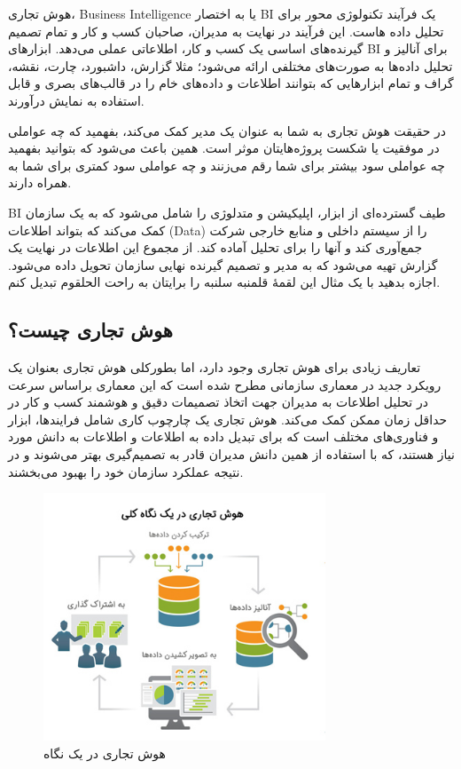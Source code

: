 \documentclass{llncs}
\begin{document}
هوش تجاری، Business Intelligence یا به اختصار BI یک فرآیند تکنولوژی محور برای تحلیل داده هاست. این فرآیند در نهایت به مدیران، صاحبان کسب و کار و تمام تصمیم گیرنده‌های اساسی یک کسب و کار، اطلاعاتی عملی می‌دهد. ابزارهای BI برای آنالیز و تحلیل داده‌ها به صورت‌های مختلفی ارائه می‌شود؛ مثلا گزارش، داشبورد، چارت، نقشه، گراف و تمام ابزارهایی که بتوانند اطلاعات و داده‌های خام را در قالب‌های بصری و قابل استفاده به نمایش درآورند.

در حقیقت هوش تجاری به شما به عنوان یک مدیر کمک می‌کند، بفهمید که چه عواملی در موفقیت یا شکست پروژه‌هایتان موثر است. همین باعث می‌شود که بتوانید بفهمید چه عواملی سود بیشتر برای شما رقم می‌زنند و چه عواملی سود کمتری برای شما به همراه دارند.

BI طیف گسترده‌ای از ابزار، اپلیکیشن‌ و متدلوژی را شامل می‌شود که به یک سازمان کمک می‌کند که بتواند اطلاعات (Data) را از سیستم داخلی و منابع خارجی شرکت جمع‌آوری کند و آنها را برای تحلیل آماده کند. از مجموع این اطلاعات در نهایت یک گزارش تهیه می‌شود که به مدیر و تصمیم گیرنده نهایی سازمان تحویل داده می‌شود. اجازه بدهید با یک مثال این لقمۀ قلمنبه سلنبه را برایتان به راحت الحلقوم تبدیل کنم.


\subsection{هوش تجاری چیست؟}
تعاریف زیادی برای هوش تجاری وجود دارد، اما بطورکلی هوش تجاری بعنوان یک رویکرد جدید در معماری سازمانی مطرح شده است که این معماری براساس سرعت در تحلیل اطلاعات به مدیران جهت اتخاذ تصمیمات دقیق و هوشمند کسب و کار در حداقل زمان ممکن کمک می‌کند. هوش تجاری یک چارچوب کاری شامل فرایندها، ابزار و فناوری‌های مختلف است که برای تبدیل داده به اطلاعات و اطلاعات به دانش مورد نیاز هستند، که با استفاده از همین دانش مدیران قادر به تصمیم‌گیری بهتر می‌شوند و در نتیجه عملکرد سازمان خود را بهبود می‌بخشند.

\begin{figure}
\centering
\includegraphics[width=0.75\textwidth]{mahi/bi-1.jpg}
\centering
\caption{هوش تجاری در یک نگاه}
\label{fig:ReportedVariables}
\end{figure}
\end{document}
